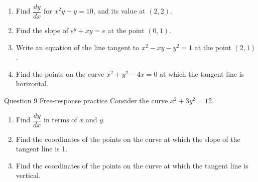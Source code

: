 \documentclass[11pt]{article}
\begin{document}
\begin{enumerate}[leftmargin=*,itemsep=2pt,start=5]
  \item Find $\dfrac{dy}{dx}$ for $x^2y+y=10$, and its value at $(2,2)$.\work{2.8cm}
  \item Find the slope of $e^{y}+xy=e$ at the point $(0,1)$.\work{2.8cm}
  \item Write an equation of the line tangent to $x^2-xy-y^2=1$ at the point $(2,1)$.\work{2.8cm}
  \item Find the points on the curve $x^2+y^2-4x=0$ at which the tangent line is horizontal.\work{2.8cm}
\end{enumerate}

\begin{frbox}{Question 9 \textperiodcentered{} Free-response practice}
Consider the curve $x^2+3y^2=12$.
\begin{enumerate}[label=(\alph*),leftmargin=*,itemsep=2pt]
  \item Find $\dfrac{dy}{dx}$ in terms of $x$ and $y$.\work{2.6cm}
  \item Find the coordinates of the points on the curve at which the slope of the tangent line is 1.\work{2.6cm}
  \item Find the coordinates of the points on the curve at which the tangent line is vertical.\work{2.6cm}
\end{enumerate}
\end{frbox}
\end{document}
